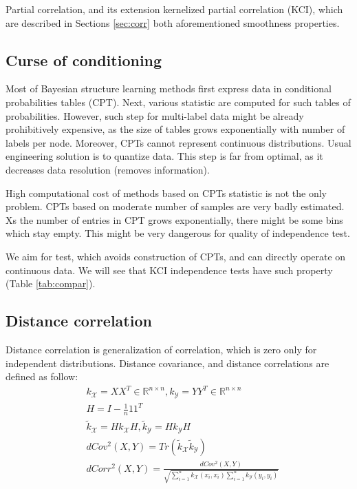 \documentclass{article} %
\begin{document}
Partial correlation, and its extension kernelized partial correlation (KCI), which are described 
in Sections \ref{sec:corr} both aforementioned smoothness properties.


\subsection{Curse of conditioning}\label{sec:curse}
Most of Bayesian structure learning methods first express data in conditional probabilities tables (CPT).
Next, various statistic are computed for such tables of probabilities. However, such step
for multi-label data might be already prohibitively expensive, as the size of tables grows
exponentially with number of labels per node. Moreover, CPTs cannot represent continuous
distributions. Usual engineering solution is to quantize data. This step is far from optimal,
as it decreases data resolution (removes information). 


High computational cost of methods based on CPTs statistic is not the only problem. 
CPTs based on moderate number of samples are very badly estimated. Xs the number
of entries in CPT grows exponentially, there might be some bins which stay empty. This might
be very dangerous for quality of independence test.



We aim for test, which avoids construction of CPTs, and can directly operate on continuous data.
We will see that KCI independence tests have such property (Table \ref{tab:compar}).


\subsection{Distance correlation}\label{sec:dist}
Distance correlation \cite{szekely2007measuring} is generalization of correlation, which is zero only for independent distributions.
Distance covariance, and distance correlations are defined as follow:
\begin{align*}
  &k_\mathcal{X} = XX^T \in \mathbb{R}^{n \times n},
  k_\mathcal{Y} = YY^T \in \mathbb{R}^{n \times n}\\
  &H = I - \frac{1}{n}11^T \\
  &\tilde{k}_\mathcal{X} = Hk_{\mathcal{X}}H, 
  \tilde{k}_\mathcal{Y} = Hk_{\mathcal{Y}}H \\
  &dCov^2(X, Y) = Tr(\tilde{k}_\mathcal{X}\tilde{k}_\mathcal{Y}) \\
  &dCorr^2(X, Y) = \frac{dCov^2(X, Y)}{\sqrt{\sum_{i=1}^nk_{\mathcal{X}}(x_i, x_i) \sum_{i=1}^nk_{\mathcal{Y}}(y_i, y_i)}} 
\end{align*}
\end{document}
